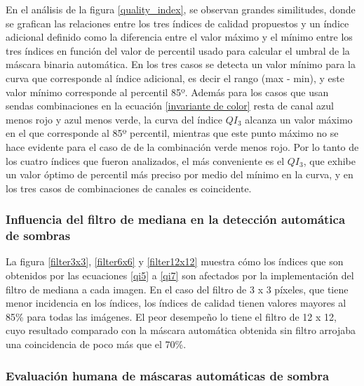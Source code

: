 En el análisis de la figura \ref{quality_index}, se observan grandes similitudes, donde se grafican las relaciones entre los tres índices de calidad propuestos y un índice adicional definido como la diferencia entre el valor máximo y el mínimo entre los tres índices en función del valor de percentil usado para calcular el umbral de la máscara binaria automática. En los tres casos se detecta un valor mínimo para la curva que corresponde al índice adicional, es decir el rango (max - min), y este valor mínimo corresponde al percentil 85º. Además para los casos que usan sendas combinaciones en la ecuación \ref{invariante de color} resta de canal azul menos rojo y azul menos verde, la curva del índice $QI_3$ alcanza un valor máximo en el que corresponde al 85º percentil, mientras que este punto máximo no se hace evidente para el caso de de la combinación verde menos rojo. Por lo tanto de los cuatro índices que fueron analizados, el más conveniente es el $QI_3$, que exhibe un valor óptimo de percentil más preciso por medio del mínimo en la curva, y en los tres casos de combinaciones de canales es coincidente.

\subsubsection{Influencia del filtro de mediana en la detección automática de sombras}

La figura \ref{filter3x3}, \ref{filter6x6} y \ref{filter12x12} muestra cómo los índices que son obtenidos por las ecuaciones \ref{qi5} a \ref{qi7} son afectados por la implementación del filtro de mediana a cada imagen. En el caso del filtro de 3 x 3 píxeles, que tiene menor incidencia en los índices, los índices de calidad tienen valores mayores al 85\% para todas las imágenes. El peor desempeño lo tiene el filtro de 12 x 12, cuyo resultado comparado con la máscara automática obtenida sin filtro arrojaba una coincidencia de poco más que el 70\%.

\subsubsection{Evaluación humana de máscaras automáticas de sombra}

